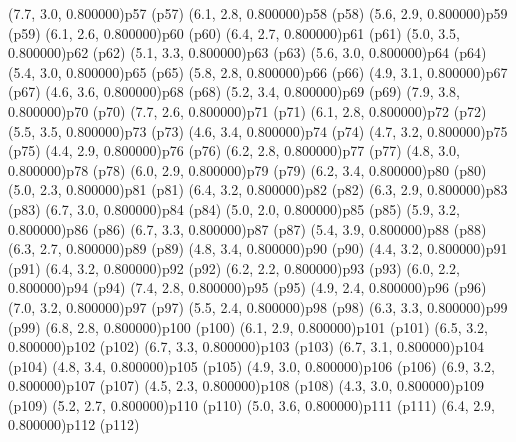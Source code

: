 \psPoint(7.7, 3.0, 0.800000){p57}
\psdot(p57)
\psPoint(6.1, 2.8, 0.800000){p58}
\psdot(p58)
\psPoint(5.6, 2.9, 0.800000){p59}
\psdot(p59)
\psPoint(6.1, 2.6, 0.800000){p60}
\psdot(p60)
\psPoint(6.4, 2.7, 0.800000){p61}
\psdot(p61)
\psPoint(5.0, 3.5, 0.800000){p62}
\psdot(p62)
\psPoint(5.1, 3.3, 0.800000){p63}
\psdot(p63)
\psPoint(5.6, 3.0, 0.800000){p64}
\psdot(p64)
\psPoint(5.4, 3.0, 0.800000){p65}
\psdot(p65)
\psPoint(5.8, 2.8, 0.800000){p66}
\psdot(p66)
\psPoint(4.9, 3.1, 0.800000){p67}
\psdot(p67)
\psPoint(4.6, 3.6, 0.800000){p68}
\psdot(p68)
\psPoint(5.2, 3.4, 0.800000){p69}
\psdot(p69)
\psPoint(7.9, 3.8, 0.800000){p70}
\psdot(p70)
\psPoint(7.7, 2.6, 0.800000){p71}
\psdot(p71)
\psPoint(6.1, 2.8, 0.800000){p72}
\psdot(p72)
\psPoint(5.5, 3.5, 0.800000){p73}
\psdot(p73)
\psPoint(4.6, 3.4, 0.800000){p74}
\psdot(p74)
\psPoint(4.7, 3.2, 0.800000){p75}
\psdot(p75)
\psPoint(4.4, 2.9, 0.800000){p76}
\psdot(p76)
\psPoint(6.2, 2.8, 0.800000){p77}
\psdot(p77)
\psPoint(4.8, 3.0, 0.800000){p78}
\psdot(p78)
\psPoint(6.0, 2.9, 0.800000){p79}
\psdot(p79)
\psPoint(6.2, 3.4, 0.800000){p80}
\psdot(p80)
\psPoint(5.0, 2.3, 0.800000){p81}
\psdot(p81)
\psPoint(6.4, 3.2, 0.800000){p82}
\psdot(p82)
\psPoint(6.3, 2.9, 0.800000){p83}
\psdot(p83)
\psPoint(6.7, 3.0, 0.800000){p84}
\psdot(p84)
\psPoint(5.0, 2.0, 0.800000){p85}
\psdot(p85)
\psPoint(5.9, 3.2, 0.800000){p86}
\psdot(p86)
\psPoint(6.7, 3.3, 0.800000){p87}
\psdot(p87)
\psPoint(5.4, 3.9, 0.800000){p88}
\psdot(p88)
\psPoint(6.3, 2.7, 0.800000){p89}
\psdot(p89)
\psPoint(4.8, 3.4, 0.800000){p90}
\psdot(p90)
\psPoint(4.4, 3.2, 0.800000){p91}
\psdot(p91)
\psPoint(6.4, 3.2, 0.800000){p92}
\psdot(p92)
\psPoint(6.2, 2.2, 0.800000){p93}
\psdot(p93)
\psPoint(6.0, 2.2, 0.800000){p94}
\psdot(p94)
\psPoint(7.4, 2.8, 0.800000){p95}
\psdot(p95)
\psPoint(4.9, 2.4, 0.800000){p96}
\psdot(p96)
\psPoint(7.0, 3.2, 0.800000){p97}
\psdot(p97)
\psPoint(5.5, 2.4, 0.800000){p98}
\psdot(p98)
\psPoint(6.3, 3.3, 0.800000){p99}
\psdot(p99)
\psPoint(6.8, 2.8, 0.800000){p100}
\psdot(p100)
\psPoint(6.1, 2.9, 0.800000){p101}
\psdot(p101)
\psPoint(6.5, 3.2, 0.800000){p102}
\psdot(p102)
\psPoint(6.7, 3.3, 0.800000){p103}
\psdot(p103)
\psPoint(6.7, 3.1, 0.800000){p104}
\psdot(p104)
\psPoint(4.8, 3.4, 0.800000){p105}
\psdot(p105)
\psPoint(4.9, 3.0, 0.800000){p106}
\psdot(p106)
\psPoint(6.9, 3.2, 0.800000){p107}
\psdot(p107)
\psPoint(4.5, 2.3, 0.800000){p108}
\psdot(p108)
\psPoint(4.3, 3.0, 0.800000){p109}
\psdot(p109)
\psPoint(5.2, 2.7, 0.800000){p110}
\psdot(p110)
\psPoint(5.0, 3.6, 0.800000){p111}
\psdot(p111)
\psPoint(6.4, 2.9, 0.800000){p112}
\psdot(p112)
